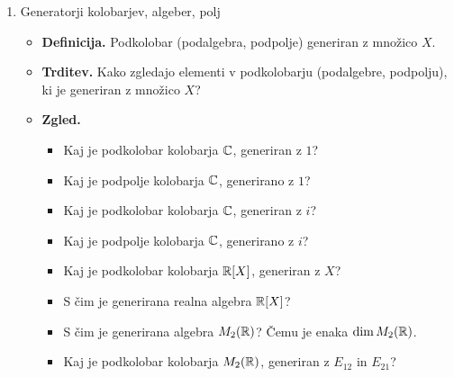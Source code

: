 \begin{enumerate}
    \item Generatorji kolobarjev, algeber, polj
    \begin{itemize}
        \item \textbf{Definicija.} Podkolobar (podalgebra, podpolje) generiran z množico \(X\).
        \item \textbf{Trditev.} Kako zgledajo elementi v podkolobarju (podalgebre, podpolju), ki je generiran z množico \(X\)?
        \item \textbf{Zgled.} \
        \begin{itemize}
            \item Kaj je podkolobar kolobarja $\mathbb{C}$, generiran z $1$?
            \item Kaj je podpolje kolobarja $\mathbb{C}$, generirano z $1$?
            \item Kaj je podkolobar kolobarja $\mathbb{C}$, generiran z $i$?
            \item Kaj je podpolje kolobarja $\mathbb{C}$, generirano z $i$?
            \item Kaj je podkolobar kolobarja $\mathbb{R}[X]$, generiran z $X$?
            \item S čim je generirana realna algebra $\mathbb{R}[X]$?
            \item S čim je generirana algebra $M_2(\mathbb{R})$? Čemu je enaka $\dim M_2(\mathbb{R})$.
            \item Kaj je podkolobar kolobarja $M_2(\mathbb{R})$, generiran z $E_{12}$ in $E_{21}$?
        \end{itemize}
    \end{itemize}
\end{enumerate}

\newpage
